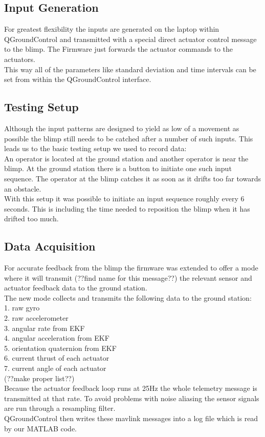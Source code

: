 \subsection{Input Generation}
\label{sub:input_generation}
For greatest flexibility the inputs are generated on the laptop within QGroundControl and transmitted with a special direct actuator control message to the blimp. The Firmware just forwards the actuator commands to the actuators. \\
This way all of the parameters like standard deviation and time intervals can be set from within the QGroundControl interface.\\

\subsection{Testing Setup}
\label{sub:testing_setup}
Although the input patterns are designed to yield as low of a movement as possible the blimp still needs to be catched after a number of such inputs. This leads us to the basic testing setup we used to record data: \\
An operator is located at the ground station and another operator is near the blimp.
At the ground station there is a button to initiate one such input sequence.
The operator at the blimp catches it as soon as it drifts too far towards an obstacle. \\
With this setup it was possible to initiate an input sequence roughly every 6 seconds. 
This is including the time needed to reposition the blimp when it has drifted too much.

\subsection{Data Acquisition}
\label{sub:data_acquisition}
For accurate feedback from the blimp the firmware was extended to offer a mode where it will transmit (??find name for this message??) the relevant sensor and actuator feedback data to the ground station. \\
The new mode collects and transmits the following data to the ground station:\\
1. raw gyro\\
2. raw accelerometer\\
3. angular rate from EKF\\
4. angular acceleration from EKF\\
5. orientation quaternion from EKF\\
6. current thrust of each actuator\\
7. current angle of each actuator\\
(??make proper list??)\\
Because the actuator feedback loop runs at 25Hz the whole telemetry message is transmitted at that rate.
To avoid problems with noise aliasing the sensor signals are run through a resampling filter. \\
QGroundControl then writes these mavlink messages into a log file which is read by our MATLAB code.

